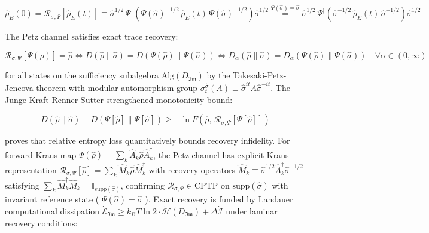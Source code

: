 \documentclass[11pt,a4paper]{article}
\theoremstyle{definition}
\theoremstyle{remark}
\begin{document}
\begin{equation}
\boxed{\hat{\rho}_E(0) = \mathcal{R}_{\sigma, \Psi}[ \hat{\rho}_E(t) ] \equiv \hat{\sigma}^{1/2} \, \Psi^\dagger\left( \Psi(\hat{\sigma})^{-1/2} \, \hat{\rho}_E(t) \, \Psi(\hat{\sigma})^{-1/2} \right) \hat{\sigma}^{1/2} \overset{\Psi(\hat{\sigma})=\hat{\sigma}}{=} \hat{\sigma}^{1/2} \, \Psi^\dagger\left( \hat{\sigma}^{-1/2} \, \hat{\rho}_E(t) \, \hat{\sigma}^{-1/2} \right) \hat{\sigma}^{1/2}}
\end{equation}


The Petz channel satisfies exact trace recovery:


\begin{equation}
\mathcal{R}_{\sigma, \Psi}[\Psi(\hat{\rho})] = \hat{\rho} \iff D(\hat{\rho} \parallel \hat{\sigma}) = D(\Psi(\hat{\rho}) \parallel \Psi(\hat{\sigma})) \iff D_\alpha(\hat{\rho} \parallel \hat{\sigma}) = D_\alpha(\Psi(\hat{\rho}) \parallel \Psi(\hat{\sigma})) \quad \forall \alpha \in (0, \infty)
\end{equation}


for all states on the sufficiency subalgebra $\mathrm{Alg}(D_{\mathfrak{Im}})$ by the Takesaki-Petz-Jencova theorem with modular automorphism group $\sigma_t^{\hat{\sigma}}(A) \equiv \hat{\sigma}^{it} A \hat{\sigma}^{-it}$. The Junge-Kraft-Renner-Sutter strengthened monotonicity bound:


\begin{equation}
D(\hat{\rho} \parallel \hat{\sigma}) - D(\Psi[\hat{\rho}] \parallel \Psi[\hat{\sigma}]) \ge -\ln F\left(\hat{\rho}, \, \mathcal{R}_{\sigma, \Psi}[\Psi[\hat{\rho}]]\right)
\end{equation}


proves that relative entropy loss quantitatively bounds recovery infidelity. For forward Kraus map $\Psi(\hat{\rho}) = \sum_k \hat{A}_k \hat{\rho} \hat{A}_k^\dagger$, the Petz channel has explicit Kraus representation $\mathcal{R}_{\sigma, \Psi}[\hat{\rho}] = \sum_k \hat{M}_k \hat{\rho} \hat{M}_k^\dagger$ with recovery operators $\hat{M}_k \equiv \hat{\sigma}^{1/2} \hat{A}_k^\dagger \hat{\sigma}^{-1/2}$ satisfying $\sum_k \hat{M}_k^\dagger \hat{M}_k = \mathbb{I}_{\mathrm{supp}(\hat{\sigma})}$, confirming $\mathcal{R}_{\sigma, \Psi} \in \mathrm{CPTP}$ on $\mathrm{supp}(\hat{\sigma})$ with invariant reference state ( $\Psi(\hat{\sigma}) = \hat{\sigma}$ ). Exact recovery is funded by Landauer computational dissipation $\dot{\mathcal{E}}_{\mathfrak{Im}} \ge k_B T \ln 2 \cdot \dot{\mathcal{H}}(D_{\mathfrak{Im}}) + \Delta \dot{\mathcal{I}}$ under laminar recovery conditions:
\end{document}
